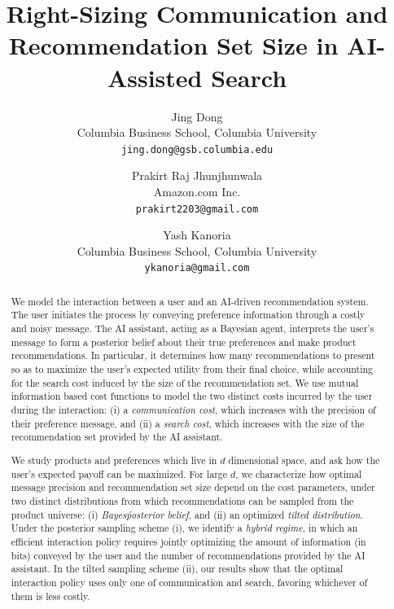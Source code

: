 \documentclass[12pt]{article}
\theoremstyle{definition}
\theoremstyle{remark}
\begin{document}
\title{Right-Sizing Communication and Recommendation Set Size in AI-Assisted Search}

\author{
\small Jing Dong\\
\small Columbia Business School, Columbia University\\
\small \texttt{jing.dong@gsb.columbia.edu}
\and
\small Prakirt Raj Jhunjhunwala\\
\small Amazon.com Inc.\\
\small \texttt{prakirt2203@gmail.com}
\and
\small Yash Kanoria\\
\small Columbia Business School, Columbia University\\
\small \texttt{ykanoria@gmail.com}
}

\date{}

\maketitle

\begin{abstract}
We model the interaction between a user and an AI-driven recommendation system. The user initiates the process by conveying preference information through a costly and noisy message. The AI assistant, acting as a Bayesian agent, interprets the user's message to form a posterior belief about their true preferences and make product recommendations. In particular, it determines how many recommendations to present so as to maximize the user's expected utility from their final choice, while accounting for the search cost induced by the size of the recommendation set. We use mutual information based cost functions to model the two distinct costs incurred by the user during the interaction: (i) a \textit{communication cost}, which increases with the precision of their preference message, and (ii) a \textit{search cost}, which increases with the size of the recommendation set provided by the AI assistant.

We study products and preferences which live in $d$ dimensional space, and ask how the user's expected payoff can be maximized. For large $d$, we characterize how optimal message precision and recommendation set size depend on the cost parameters, under two distinct distributions from which recommendations can be sampled from the product universe: (i) \textit{Bayes\' posterior belief}, and (ii) an optimized \textit{tilted distribution}. Under the posterior sampling scheme (i), we identify a \textit{hybrid regime}, in which an efficient interaction policy requires jointly optimizing the amount of information (in bits) conveyed by the user and the number of recommendations provided by the AI assistant. In the tilted sampling scheme (ii), our results show that the optimal interaction policy uses only one of communication and search, favoring whichever of them is less costly.
\end{abstract}
\end{document}
